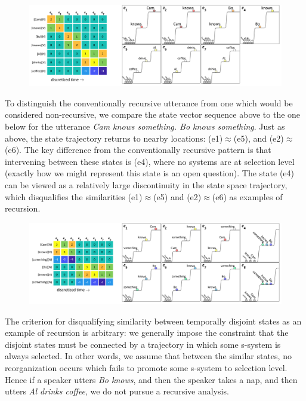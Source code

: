   
\begin{figure}
\includegraphics[width=\textwidth]{figures/Tilsen-img112.png}
\caption{\missingcaption}
\label{fig:}
\end{figure}
 

  To distinguish the conventionally recursive utterance from one which would be considered non-recursive, we compare the state vector sequence above to the one below for the utterance \textit{Cam knows something. Bo knows something}. Just as above, the state trajectory returns to nearby locations: (e1)${\approx}$(e5), and (e2)${\approx}$(e6). The key difference from the conventionally recursive pattern is that intervening between these states is (e4), where no systems are at selection level (exactly how we might represent this state is an open question). The state (e4) can be viewed as a relatively large discontinuity in the state space trajectory, which disqualifies the similarities (e1)${\approx}$(e5) and (e2)${\approx}$(e6) as examples of recursion.

  
\begin{figure}
\includegraphics[width=\textwidth]{figures/Tilsen-img113.png}
\caption{\missingcaption}
\label{fig:}
\end{figure}
 

  The criterion for disqualifying similarity between temporally disjoint states as an example of recursion is arbitrary: we generally impose the constraint that the disjoint states must be connected by a trajectory in which some s-system is always selected. In other words, we assume that between the similar states, no reorganization occurs which fails to promote some s-system to selection level. Hence if a speaker utters \textit{Bo knows}, and then the speaker takes a nap, and then utters \textit{Al drinks coffee}, we do not pursue a recursive analysis. 

